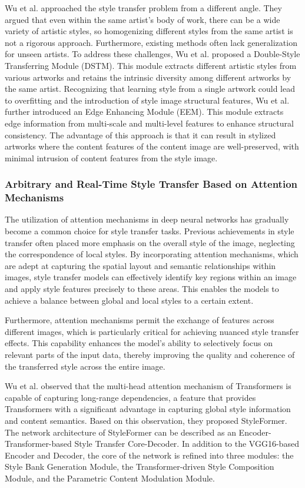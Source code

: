 \documentclass[preprint,12pt]{elsarticle}
\begin{document}
Wu et al.\citep{47wu2023preserving} approached the style transfer problem from a different angle. They argued that even within the same artist's body of work, there can be a wide variety of artistic styles, so homogenizing different styles from the same artist is not a rigorous approach. Furthermore, existing methods often lack generalization for unseen artists. To address these challenges, Wu et al. proposed a Double-Style Transferring Module (DSTM). This module extracts different artistic styles from various artworks and retains the intrinsic diversity among different artworks by the same artist. Recognizing that learning style from a single artwork could lead to overfitting and the introduction of style image structural features, Wu et al. further introduced an Edge Enhancing Module (EEM). This module extracts edge information from multi-scale and multi-level features to enhance structural consistency. The advantage of this approach is that it can result in stylized artworks where the content features of the content image are well-preserved, with minimal intrusion of content features from the style image.

\subsubsection{Arbitrary and Real-Time Style Transfer Based on Attention Mechanisms}

The utilization of attention mechanisms in deep neural networks has gradually become a common choice for style transfer tasks. Previous achievements in style transfer often placed more emphasis on the overall style of the image, neglecting the correspondence of local styles. By incorporating attention mechanisms, which are adept at capturing the spatial layout and semantic relationships within images, style transfer models can effectively identify key regions within an image and apply style features precisely to these areas. This enables the models to achieve a balance between global and local styles to a certain extent.

Furthermore, attention mechanisms permit the exchange of features across different images, which is particularly critical for achieving nuanced style transfer effects. This capability enhances the model's ability to selectively focus on relevant parts of the input data, thereby improving the quality and coherence of the transferred style across the entire image.

Wu et al.\citep{110wu2021styleformer} observed that the multi-head attention mechanism of Transformers is capable of capturing long-range dependencies, a feature that provides Transformers with a significant advantage in capturing global style information and content semantics. Based on this observation, they proposed StyleFormer. The network architecture of StyleFormer can be described as an Encoder-Transformer-based Style Transfer Core-Decoder. In addition to the VGG16-based Encoder and Decoder, the core of the network is refined into three modules: the Style Bank Generation Module, the Transformer-driven Style Composition Module, and the Parametric Content Modulation Module.
\end{document}
